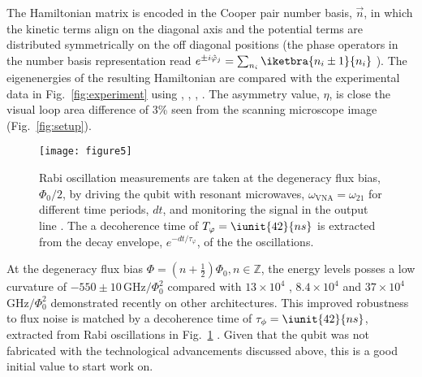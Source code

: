 The Hamiltonian matrix is encoded in the Cooper pair number basis,
$\vec{n} $, in which the kinetic terms align on the diagonal axis and
the potential terms are distributed symmetrically on the off diagonal
positions (the phase operators in the number basis representation
read
$ e^{\pm i\hat{\varphi}_j} = \sum_{n_i}\iketbra{n_i\pm1}{n_i}$
\cite{phase}). The eigenenergies of the resulting Hamiltonian are
compared with the experimental data in Fig.~\ref{fig:experiment}
using , , , . The asymmetry value, $ \eta $, is close
the visual loop area difference of 3\% seen from the scanning
microscope image (Fig.~\ref{fig:setup}).
 
 \begin{figure}[h!]
   \texttt{[image: figure5]}
   \caption{Rabi oscillation measurements are taken at the degeneracy flux bias,
     $ \Phi_0/2 $, by driving the qubit with resonant microwaves, $\omega_{\text{VNA}} = \omega_{21}$ for different time periods, $ dt $, and monitoring the
     signal in the output line \cite{rabi}. The a decoherence time of
     $ T_\varphi = \iunit{42}{ns} $ is extracted from the decay envelope,
     $ e^{-dt/\tau_\varphi} $, of the the oscillations. \label{fig:rabi}}
 \end{figure}

 At the degeneracy flux bias
 $ \Phi = (n + \frac{1}{2})\Phi_0, n\in\mathbb{Z} $, the energy levels posses
 a low curvature of $ -550\pm10\,\text{GHz}/\Phi_0^2 $ compared with
 $ 13\times 10^4$ \cite{stern2014},
 $ 8.4 \times 10^4$ \cite{zhu2010} and
 $ 37\times 10^{4}$ \cite{gustavsson2012} $ \text{GHz}/\Phi_0^2$ demonstrated
 recently on other architectures. This improved robustness to flux noise is matched
 by a decoherence time of $ \tau_\phi = \iunit{42}{ns} $, extracted from Rabi
 oscillations in Fig.~\ref{fig:rabi} \cite{rabi}. Given that the qubit was not fabricated with
 the technological advancements discussed above, this is a good initial value to
 start work on.

